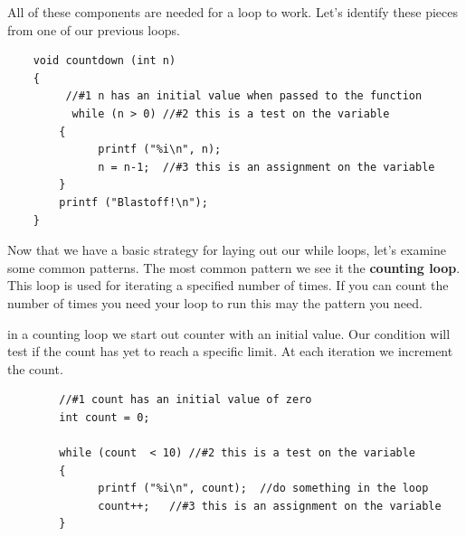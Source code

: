 All of these components are needed for a loop to work. Let's identify these pieces from one of our previous loops. 

\begin{verbatim}
	void countdown (int n) 
	{
		 //#1 n has an initial value when passed to the function
		  while (n > 0) //#2 this is a test on the variable
	 	{
		 	  printf ("%i\n", n);
		 	  n = n-1;  //#3 this is an assignment on the variable
	 	}
	 	printf ("Blastoff!\n");
	}
\end{verbatim}
%
Now that we have a basic strategy for laying out our while loops, let's examine some common patterns. The most common pattern we see it the {\bf counting loop}. This loop is used for iterating a specified number of times. If you can count the number of times you need your loop to run this may the pattern you need.

in a counting loop we start out counter with an initial value. Our condition will test if the count has yet to reach a specific limit. At each iteration we increment the count. 
\begin{verbatim}
		//#1 count has an initial value of zero
		int count = 0;
		
		while (count  < 10) //#2 this is a test on the variable
		{
			  printf ("%i\n", count);  //do something in the loop
			  count++;   //#3 this is an assignment on the variable
		}
\end{verbatim}
%

